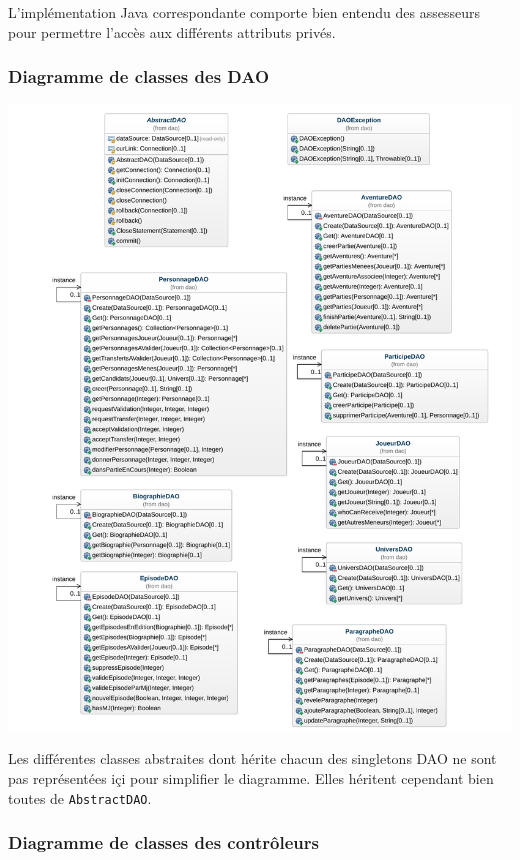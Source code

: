 \documentclass[a4paper, 11pt, titlepage]{article}
\begin{document}
L'implémentation Java correspondante comporte bien entendu des assesseurs pour permettre l'accès aux différents attributs privés.


\subsubsection {Diagramme de classes des DAO}

\begin{center}
\includegraphics[scale=0.55]{conception/dao.pdf}
\end{center}

Les différentes classes abstraites dont hérite chacun des singletons DAO ne sont pas représentées içi pour simplifier le diagramme. Elles héritent cependant bien toutes de \lstinline!AbstractDAO!.


\subsubsection {Diagramme de classes des contrôleurs}
\end{document}
